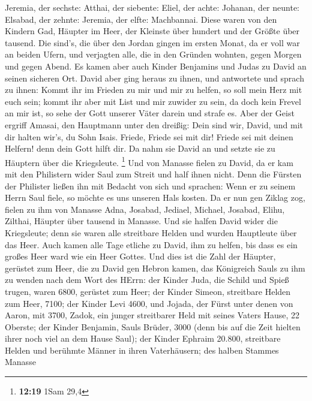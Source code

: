 Jeremia,  der sechste: Atthai, der siebente: Eliel,
 der achte: Johanan, der neunte: Elsabad,  der
zehnte: Jeremia, der elfte: Machbannai.  Diese waren von
den Kindern Gad, Häupter im Heer, der Kleinste über hundert und der
Größte über tausend.  Die sind's, die über den Jordan
gingen im ersten Monat, da er voll war an beiden Ufern, und verjagten
alle, die in den Gründen wohnten, gegen Morgen und gegen Abend.
 Es kamen aber auch Kinder Benjamins und Judas zu David an
seinen sicheren Ort.  David aber ging heraus zu ihnen, und
antwortete und sprach zu ihnen: Kommt ihr im Frieden zu mir und mir zu
helfen, so soll mein Herz mit euch sein; kommt ihr aber mit List und mir
zuwider zu sein, da doch kein Frevel an mir ist, so sehe der Gott
unserer Väter darein und strafe es.  Aber der Geist ergriff
Amasai, den Hauptmann unter den dreißig: Dein sind wir, David, und mit
dir halten wir's, du Sohn Isais. Friede, Friede sei mit dir! Friede sei
mit deinen Helfern! denn dein Gott hilft dir. Da nahm sie David an und
setzte sie zu Häuptern über die Kriegsleute. \footnote{\textbf{12:19}
  1Sam 29,4}  Und von Manasse fielen zu David, da er kam
mit den Philistern wider Saul zum Streit und half ihnen nicht. Denn die
Fürsten der Philister ließen ihn mit Bedacht von sich und sprachen: Wenn
er zu seinem Herrn Saul fiele, so möchte es uns unseren Hals kosten.
 Da er nun gen Ziklag zog, fielen zu ihm von Manasse Adna,
Josabad, Jediael, Michael, Josabad, Elihu, Zilthai, Häupter über tausend
in Manasse.  Und sie halfen David wider die Kriegsleute;
denn sie waren alle streitbare Helden und wurden Hauptleute über das
Heer.  Auch kamen alle Tage etliche zu David, ihm zu
helfen, bis dass es ein großes Heer ward wie ein Heer Gottes.
 Und dies ist die Zahl der Häupter, gerüstet zum Heer, die
zu David gen Hebron kamen, das Königreich Sauls zu ihm zu wenden nach
dem Wort des HErrn:  der Kinder Juda, die Schild und Spieß
trugen, waren 6800, gerüstet zum Heer;  der Kinder Simeon,
streitbare Helden zum Heer, 7100;  der Kinder Levi 4600,
 und Jojada, der Fürst unter denen von Aaron, mit 3700,
 Zadok, ein junger streitbarer Held mit seines Vaters
Hause, 22 Oberste;  der Kinder Benjamin, Sauls Brüder, 3000
(denn bis auf die Zeit hielten ihrer noch viel an dem Hause Saul);
 der Kinder Ephraim 20.800, streitbare Helden und berühmte
Männer in ihren Vaterhäusern;  des halben Stammes Manasse
